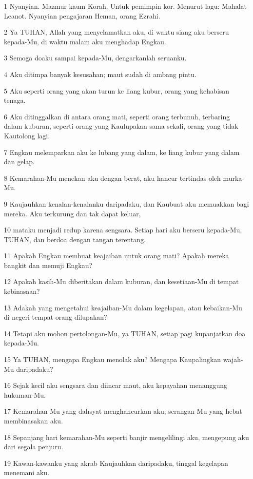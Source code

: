\par 1 Nyanyian. Mazmur kaum Korah. Untuk pemimpin kor. Menurut lagu: Mahalat Leanot. Nyanyian pengajaran Heman, orang Ezrahi.
\par 2 Ya TUHAN, Allah yang menyelamatkan aku, di waktu siang aku berseru kepada-Mu, di waktu malam aku menghadap Engkau.
\par 3 Semoga doaku sampai kepada-Mu, dengarkanlah seruanku.
\par 4 Aku ditimpa banyak kesusahan; maut sudah di ambang pintu.
\par 5 Aku seperti orang yang akan turun ke liang kubur, orang yang kehabisan tenaga.
\par 6 Aku ditinggalkan di antara orang mati, seperti orang terbunuh, terbaring dalam kuburan, seperti orang yang Kaulupakan sama sekali, orang yang tidak Kautolong lagi.
\par 7 Engkau melemparkan aku ke lubang yang dalam, ke liang kubur yang dalam dan gelap.
\par 8 Kemarahan-Mu menekan aku dengan berat, aku hancur tertindas oleh murka-Mu.
\par 9 Kaujauhkan kenalan-kenalanku daripadaku, dan Kaubuat aku memuakkan bagi mereka. Aku terkurung dan tak dapat keluar,
\par 10 mataku menjadi redup karena sengsara. Setiap hari aku berseru kepada-Mu, TUHAN, dan berdoa dengan tangan terentang.
\par 11 Apakah Engkau membuat keajaiban untuk orang mati? Apakah mereka bangkit dan memuji Engkau?
\par 12 Apakah kasih-Mu diberitakan dalam kuburan, dan kesetiaan-Mu di tempat kebinasaan?
\par 13 Adakah yang mengetahui keajaiban-Mu dalam kegelapan, atau kebaikan-Mu di negeri tempat orang dilupakan?
\par 14 Tetapi aku mohon pertolongan-Mu, ya TUHAN, setiap pagi kupanjatkan doa kepada-Mu.
\par 15 Ya TUHAN, mengapa Engkau menolak aku? Mengapa Kaupalingkan wajah-Mu daripadaku?
\par 16 Sejak kecil aku sengsara dan diincar maut, aku kepayahan menanggung hukuman-Mu.
\par 17 Kemarahan-Mu yang dahsyat menghancurkan aku; serangan-Mu yang hebat membinasakan aku.
\par 18 Sepanjang hari kemarahan-Mu seperti banjir mengelilingi aku, mengepung aku dari segala penjuru.
\par 19 Kawan-kawanku yang akrab Kaujauhkan daripadaku, tinggal kegelapan menemani aku.

